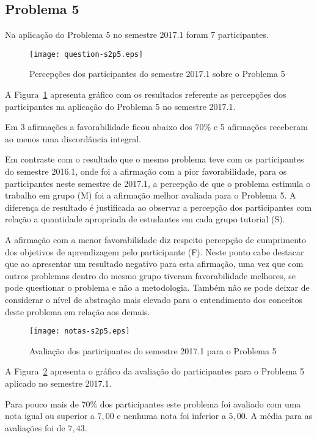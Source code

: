 \subsection{Problema 5}
Na aplicação do Problema 5 no semestre 2017.1 foram 7 participantes.

\begin{figure}[!htb]
\centering
\texttt{[image: question-s2p5.eps]}
\caption{Percepções dos participantes do semestre 2017.1 sobre o Problema 5}
\label{percep-s2p5}
\end{figure}

A Figura~\ref{percep-s2p5} apresenta gráfico com os resultados referente
as percepções dos participantes na aplicação do
Problema 5 no semestre 2017.1.

Em 3 afirmações a favorabilidade ficou abaixo dos $70\%$ e 5 afirmações
receberam ao menos uma discordância integral.

Em contraste com o resultado que o mesmo problema teve com
os participantes do semestre 2016.1, onde foi a afirmação com a
pior favorabilidade, para os participantes neste semestre de
2017.1, a percepção de que o problema estimula o
trabalho em grupo (M) foi a afirmação melhor avaliada
para o Problema 5.
A diferença de resultado é justificada ao observar
a percepção dos participantes com relação a quantidade
apropriada de estudantes em cada grupo tutorial (S).

A afirmação com a menor favorabilidade diz respeito
percepção de cumprimento dos objetivos de aprendizagem
pelo participante (F).
Neste ponto cabe destacar que ao apresentar um resultado
negativo para esta afirmação, uma vez que com outros
problemas dentro do mesmo grupo tiveram favorabilidade
melhores, se pode questionar o problema e não
a metodologia.
Também não se pode deixar de considerar o nível de abstração
mais elevado para o entendimento dos conceitos deste
problema em relação aos demais.


\begin{figure}[!htb]
\centering
\texttt{[image: notas-s2p5.eps]}
\caption{Avaliação dos participantes do semestre 2017.1 para o Problema 5}
\label{aval-s2p5}
\end{figure}

A Figura~\ref{aval-s2p5} apresenta o gráfico da
avaliação do participantes para o Problema 5 aplicado no semestre 2017.1.

Para pouco mais de $70\%$ dos participantes este problema foi avaliado
com uma nota igual ou superior a $7,00$ e nenhuma nota
foi inferior a $5,00$. A média para as avaliações foi de $7,43$.


